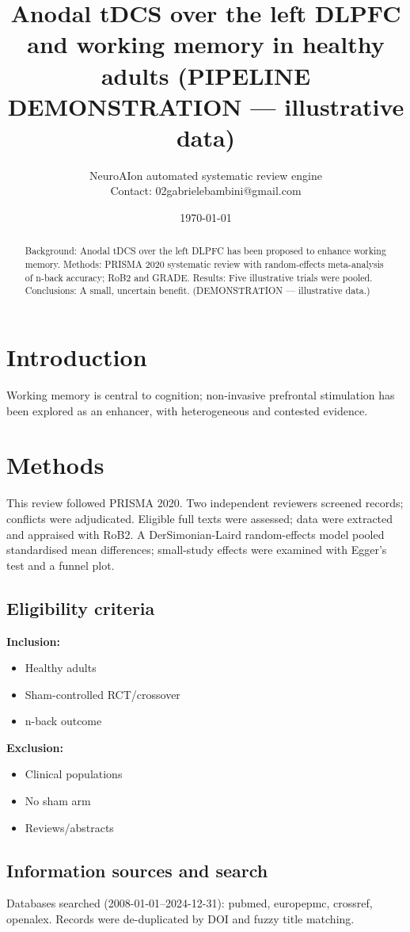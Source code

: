 \documentclass[11pt]{article}
\title{Anodal tDCS over the left DLPFC and working memory in healthy adults (PIPELINE DEMONSTRATION --- illustrative data)}
\author{NeuroAIon automated systematic review engine\\ \small Contact: 02gabrielebambini@gmail.com}
\date{\today}
\begin{document}
\maketitle
\begin{abstract}
Background: Anodal tDCS over the left DLPFC has been proposed to enhance working memory. Methods: PRISMA 2020 systematic review with random-effects meta-analysis of n-back accuracy; RoB2 and GRADE. Results: Five illustrative trials were pooled. Conclusions: A small, uncertain benefit. (DEMONSTRATION --- illustrative data.)
\end{abstract}
\section{Introduction}
Working memory is central to cognition; non-invasive prefrontal stimulation has been explored as an enhancer, with heterogeneous and contested evidence.
\section{Methods}
This review followed PRISMA 2020. Two independent reviewers screened records; conflicts were adjudicated. Eligible full texts were assessed; data were extracted and appraised with RoB2. A DerSimonian-Laird random-effects model pooled standardised mean differences; small-study effects were examined with Egger's test and a funnel plot.

\subsection{Eligibility criteria}
\textbf{Inclusion:}
\begin{itemize}
\item Healthy adults
\item Sham-controlled RCT/crossover
\item n-back outcome
\end{itemize}
\textbf{Exclusion:}
\begin{itemize}
\item Clinical populations
\item No sham arm
\item Reviews/abstracts
\end{itemize}
\subsection{Information sources and search}
Databases searched (2008-01-01--2024-12-31): pubmed, europepmc, crossref, openalex. Records were de-duplicated by DOI and fuzzy title matching.
\end{document}
